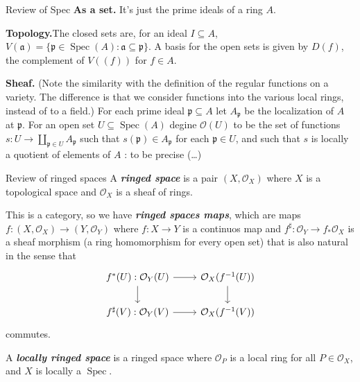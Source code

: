 \begin{thing1}{Review of Spec}\leavevmode
	{\color{2}\bfseries As a set.}\hspace{.5em} It's just the prime ideals of a ring $A$.

	{\color{2}\bfseries Topology.}\hspace{.5em}The closed sets are, for an ideal $I\subseteq A$, $V(\mathfrak{a})=\{\mathfrak{p}\in\operatorname{Spec}(A) :\mathfrak{a}\subseteq \mathfrak{p}\}$. A basis for the open sets is given by $D(f)$, the complement of  $V((f))$ for $f\in A$.

{\color{2}\bfseries Sheaf.}\hspace{.5em} {\color{5}(Note the similarity with the definition of the regular functions on a variety. The difference is that we consider functions into the various local rings, instead of to a field.)} For each prime ideal $\mathfrak{p}\subseteq A$ let $A_{\mathfrak{p}}$ be the localization of $A$ at $ \mathfrak{p}$. For an open set $U\subseteq \operatorname{Spec}(A)$ degine $\mathcal{O}(U)$ to be the set of functions $s:U\longrightarrow \coprod_{\mathfrak{p}\in U}A_{\mathfrak{p}}$ such that $s(\mathfrak{p})\in A_{\mathfrak{p}}$ for each $\mathfrak{p}\in U$, and such that $s$ is locally a quotient of elements of $A$ : to be precise (…)
\end{thing1}

\begin{thing1}{Review of ringed spaces}\leavevmode
	A \textit{\textbf{ringed space}} is a pair  $(X,\mathcal{O}_X)$ where $X$ is a topological space and $\mathcal{O}_X$ is a sheaf of rings.

	This is a category, so we have \textit{\textbf{ringed spaces maps}}, which are maps  $f:(X,\mathcal{O}_X)\longrightarrow (Y,\mathcal{O}_Y)$ where $f:X\longrightarrow Y$ is a continuos map and $f^\sharp:\mathcal{O}_Y\longrightarrow f_*\mathcal{O}_X$ is a sheaf morphism (a ring homomorphism for every open set) that is also natural in the sense that
	\[\begin{tikzcd}
		f^*(U):\mathcal{O}_Y(U)\arrow[r]\arrow[d]&\mathcal{O}_X(f^{-1}(U))\arrow[d]\\
		f^\sharp(V):\mathcal{O}_Y(V)\arrow[r]&\mathcal{O}_X(f^{-1}(V))
	\end{tikzcd}\]
	commutes.

	A \textit{\textbf{locally ringed space}} is a ringed space where  $\mathcal{O}_P$ is a local ring for all $P\in\mathcal{O}_X$, and $X$ is locally a  $\operatorname{Spec}$.
\end{thing1}

